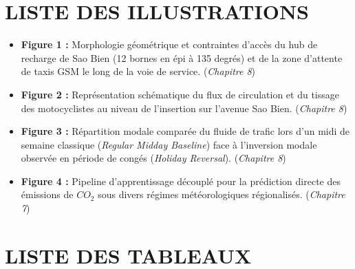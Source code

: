 \documentclass[10pt, a4paper]{article}
\providecommand{\tightlist}{}
\begin{document}
\section{LISTE DES ILLUSTRATIONS}\label{liste-des-illustrations}

\begin{itemize}
\tightlist
\item
  \textbf{Figure 1 :} Morphologie géométrique et contraintes d'accès du
  hub de recharge de Sao Bien (12 bornes en épi à 135 degrés) et de la
  zone d'attente de taxis GSM le long de la voie de service.
  (\emph{Chapitre 8})
\item
  \textbf{Figure 2 :} Représentation schématique du flux de circulation
  et du tissage des motocyclistes au niveau de l'insertion sur l'avenue
  Sao Bien. (\emph{Chapitre 8})
\item
  \textbf{Figure 3 :} Répartition modale comparée du fluide de trafic
  lors d'un midi de semaine classique (\emph{Regular Midday Baseline})
  face à l'inversion modale observée en période de congés (\emph{Holiday
  Reversal}). (\emph{Chapitre 8})
\item
  \textbf{Figure 4 :} Pipeline d'apprentissage découplé pour la
  prédiction directe des émissions de \(CO_2\) sous divers régimes
  météorologiques régionalisés. (\emph{Chapitre 7})
\end{itemize}

\newpage

\section{LISTE DES TABLEAUX}\label{liste-des-tableaux}
\end{document}
